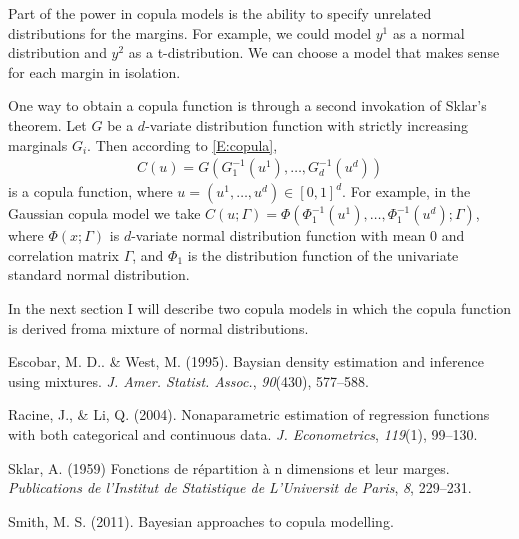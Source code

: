 \documentclass[letterpaper,11pt]{article}
\begin{document}
Part of the power in copula models is the ability to specify unrelated distributions for the margins. For example, we could model $y^1$ as a normal distribution and $y^2$ as a t-distribution. We can choose a model that makes sense for each margin in isolation.

One way to obtain a copula function is through a second invokation of Sklar's theorem. Let $G$ be a $d$-variate distribution function with strictly increasing marginals $G_i$. Then according to \eqref{E:copula},
\begin{align}
    C(u) = G\left( G_1^{-1}(u^1), \dots, G_d^{-1}(u^d) \right)
    \label{E:copula-2}
\end{align}
is a copula function, where $u = (u^1, \dots, u^d) \in [0, 1]^d$. For example, in the Gaussian copula model we take $C(u; \Gamma) =  \Phi\left( \Phi_1^{-1}(u^1), \dots, \Phi_1^{-1}(u^d); \Gamma \right)$, where $\Phi(x; \Gamma)$ is $d$-variate normal distribution function with mean 0 and correlation matrix $\Gamma$, and $\Phi_1$ is the distribution function of the univariate standard normal distribution.

In the next section I will describe two copula models in which the copula function is derived froma mixture of normal distributions.

\begin{thebibliography}{9}
     Escobar, M. D.. \& West, M. (1995). Baysian density estimation and inference using mixtures. \emph{J. Amer. Statist. Assoc.}, \emph{90}(430), 577--588.

     Racine, J., \& Li, Q. (2004). Nonaparametric estimation of regression functions with both categorical and continuous data. \emph{J. Econometrics}, \emph{119}(1), 99--130.

     Sklar, A. (1959) Fonctions de r\'epartition \`a n dimensions et leur marges. \emph{Publications de l'Institut de Statistique de L'Universit de Paris}, \emph{8}, 229--231.

     Smith, M. S. (2011). Bayesian approaches to copula modelling.
\end{thebibliography}
\end{document}
